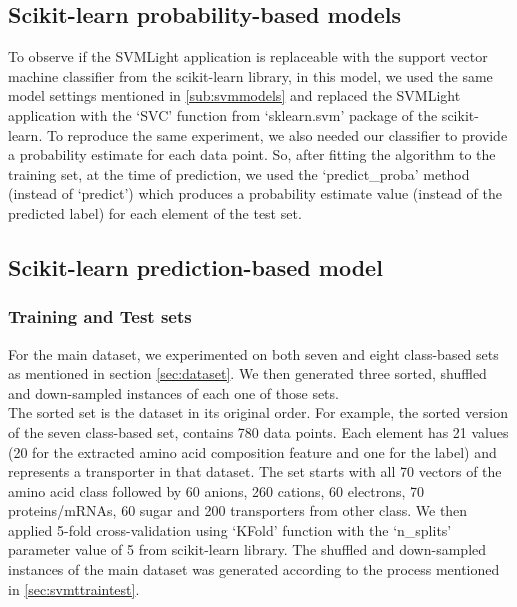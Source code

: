 \subsection{Scikit-learn probability-based models}
\label{sub:scikitprob}
    To observe if the SVMLight application is replaceable with the support vector machine classifier from the scikit-learn 
    library, in this model, we used the same model settings mentioned in \ref{sub:svmmodels} and replaced the SVMLight application 
    with the `SVC' function from `sklearn.svm' package of the scikit-learn. To reproduce the same experiment, 
    we also needed our classifier to provide a probability estimate for each data point. So, after fitting the algorithm 
    to the training set, at the time of prediction, we used the `predict\_proba' method (instead of `predict')
    which produces a probability estimate value (instead of the predicted label) for each element of the test set.

\subsection{Scikit-learn prediction-based model}
\label{sub:scikitpred}

    \subsubsection{Training and Test sets}
    \label{subsub:scikittraintest}
    For the main dataset, we experimented on both seven and eight class-based sets as mentioned in section \ref{sec:dataset}.
    We then generated three sorted, shuffled and down-sampled instances of each one of those sets.\\

    The sorted set is the dataset in its original order. For example, the sorted version of the seven class-based set, 
    contains 780 data points. Each element has 21 values (20 for the extracted amino acid composition feature and one for the label) 
    and represents a transporter in that dataset. The set starts with all 70 vectors of the amino acid class 
    followed by 60 anions, 260 cations, 60 electrons, 70 proteins/mRNAs, 60 sugar and 200 transporters from other class. 
    We then applied 5-fold cross-validation using `KFold' function with the `n\_splits' parameter value of 5 from scikit-learn library. 
    The shuffled and down-sampled instances of the main dataset was generated according 
    to the process mentioned in \ref{sec:svmttraintest}.\\
   
